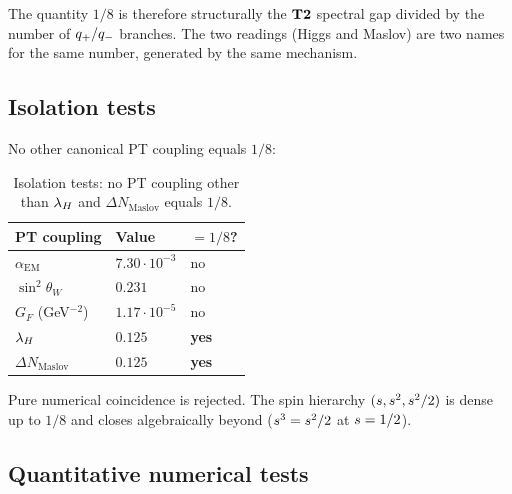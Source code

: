 The quantity $1/8$ is therefore structurally the $\textbf{T2}$ spectral
gap divided by the number of $q_{+}/q_{-}$ branches. The two
readings (Higgs and Maslov) are two names for the same number,
generated by the same mechanism.

\subsection{Isolation tests}
\label{sec:isolation}

No other canonical PT coupling equals $1/8$:

\begin{table}[ht]
\centering
\begin{tabular}{@{}lll@{}}
\toprule
\textbf{PT coupling} & \textbf{Value} & \textbf{$= 1/8$?}\\
\midrule
$\alpha_{\mathrm{EM}}$ & $7.30 \cdot 10^{-3}$ & no\\
$\sin^{2}\theta_W$ & $0.231$ & no\\
$G_F$ (GeV$^{-2}$) & $1.17 \cdot 10^{-5}$ & no\\
$\lambda_H$ & $\mathbf{0.125}$ & \textbf{yes}\\
$\Delta N_{\mathrm{Maslov}}$ & $\mathbf{0.125}$ & \textbf{yes}\\
\bottomrule
\end{tabular}
\caption{Isolation tests: no PT coupling other than $\lambda_H$ and
$\Delta N_{\mathrm{Maslov}}$ equals $1/8$.}
\label{tab:isolation}
\end{table}

Pure numerical coincidence is rejected. The spin hierarchy
$(s, s^{2}, s^{2}/2)$ is dense up to $1/8$ and closes
algebraically beyond ($s^{3} = s^{2}/2$ at $s = 1/2$).

\subsection{Quantitative numerical tests}
\label{sec:tests_higgs}

